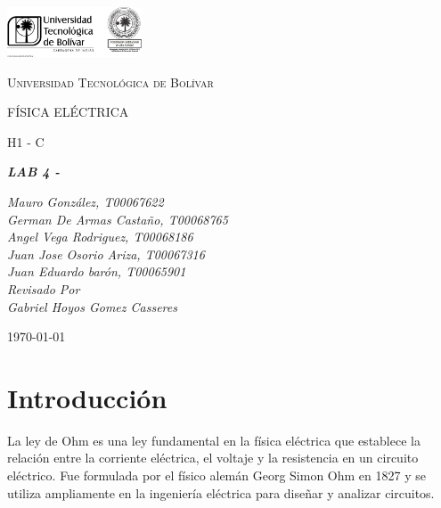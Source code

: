 \documentclass[letterpaper, 12pt]{report}
\begin{document}
\begin{titlepage}
	\centering
	\includegraphics[width=0.3\textwidth]{Images/logo_utb.png}\par\vspace{1cm}
	{\scshape\LARGE Universidad Tecnológica de Bolívar \par}
	\vspace{1cm}

	{\scshape\Large FÍSICA ELÉCTRICA \par}
	\vspace{.2cm}

	{\scshape\Large H1 - C \par}
	\vspace{1cm}
	\slshape {\Large \bfseries{} LAB 4 -   \\}
	\vspace{1cm}

	\slshape {\itshape{} Mauro González, T00067622 \\}
	\slshape {\itshape{} German De Armas Castaño, T00068765 \\}
	\slshape {\itshape{} Angel Vega Rodriguez, T00068186 \\}
	\slshape {\itshape{} Juan Jose Osorio Ariza, T00067316 \\}
	\slshape {\itshape{} Juan Eduardo barón, T00065901 \\}
	\vfill
	Revisado Por \\
	Gabriel Hoyos Gomez Casseres\\
	{\large \today\par}
\end{titlepage}

\section{Introducción}

La ley de Ohm es una ley fundamental en la física eléctrica que establece la
relación entre la corriente eléctrica, el voltaje y la resistencia en un
circuito eléctrico. Fue formulada por el físico alemán Georg Simon Ohm en
1827 y se utiliza ampliamente en la ingeniería eléctrica para diseñar y
analizar circuitos.

\bigskip
\end{document}

